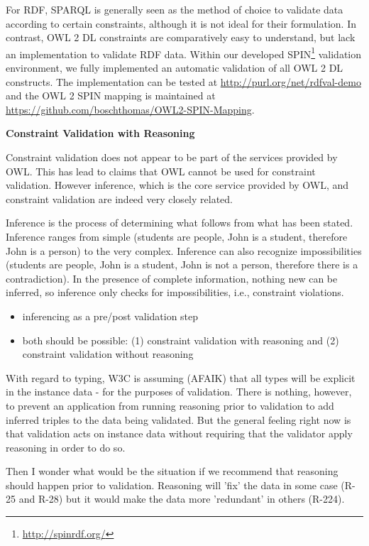 \documentclass{llncs}
\begin{document}
For RDF, SPARQL is generally seen as the method of choice to validate data according to certain constraints, although it is not ideal for their formulation. 
In contrast, OWL 2 DL constraints are comparatively easy to understand, but lack an implementation to validate RDF data.
Within our developed SPIN\footnote{\url{http://spinrdf.org/}} validation environment, we fully implemented an automatic validation of all OWL 2 DL constructs. 
The implementation can be tested at \url{http://purl.org/net/rdfval-demo} and
the OWL 2 SPIN mapping is maintained at \url{https://github.com/boschthomas/OWL2-SPIN-Mapping}.

\textbf{Constraint Validation with Reasoning}

Constraint validation does not appear to be part of the services provided by
OWL.  This has lead to claims that OWL cannot be used for constraint
validation.  However inference, which is the core service provided by OWL,
and constraint validation are indeed very closely related.

Inference is the process of determining what follows from what has been
stated.  Inference ranges from simple (students are people, John is a
student, therefore John is a person) to the very complex.  Inference can
also recognize impossibilities (students are people, John is a student, John
is not a person, therefore there is a contradiction).  In the presence of
complete information, nothing new can be inferred, so inference only checks
for impossibilities, i.e., constraint violations.  

\begin{itemize}
	\item inferencing as a pre/post validation step
	\item both should be possible: (1) constraint validation with reasoning and (2) constraint validation without reasoning 
\end{itemize}

With regard to typing, W3C is assuming (AFAIK) that all types will be
explicit in the instance data - for the purposes of validation. There is
nothing, however, to prevent an application from running reasoning prior
to validation to add inferred triples to the data being validated. But
the general feeling right now is that validation acts on instance data
without requiring that the validator apply reasoning in order to do so.

Then I wonder what would be the situation if we recommend that reasoning should happen prior to validation. Reasoning will 'fix' the data in some case (R-25 and R-28) but it would make the data more 'redundant' in others (R-224).
\end{document}
